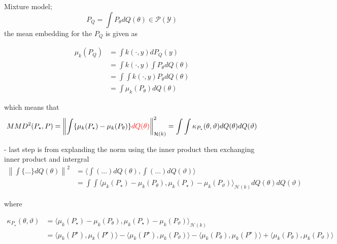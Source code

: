 \documentclass[mstat,12pt]{unswthesis}
\newcommand{\add}[1]{{\color{red}#1}}
\begin{document}
Mixture model; $$P_Q = \int P_\theta dQ(\theta) \in \mathcal{P}(\mathcal{Y})$$
the mean embedding for the $P_Q$ is given as

$$
    \begin{aligned}
        \mu_k(P_Q) & = \int k(\cdot, y) d P_Q(y) \\ &= \int k(\cdot, y)\int P_\theta dQ(\theta) \\ &= \int \int k(\cdot, y) P_\theta dQ(\theta) \\ &= \int \mu_k (P_{\theta}) dQ(\theta)
    \end{aligned}
$$

which means that
$$MMD^2(P_\star, P) = \left\| \int \{ \mu_k(P_\star) - \mu_k(P_\theta) \} \add{dQ(\theta)}\right\|^2_{\mathcal{H}(k)} = \int\int\kappa_{P_{\star}}(\theta, \vartheta) dQ(\theta)dQ(\vartheta)$$

- last step is from explanding the norm using the inner product then exchanging inner product and intergral
$$\begin{aligned}
        \left\| \int \{ \dots \} dQ(\theta) \right\|^2 & = \langle \int (\dots) dQ(\theta), \int (\dots) dQ(\vartheta) \rangle                                                                         \\
                                                       & = \int \int \langle \mu_k(P_\star) - \mu_k(P_\theta), \mu_k(P_\star) - \mu_k(P_{\vartheta}) \rangle_{\mathcal{H}(k)} dQ(\theta) dQ(\vartheta)
    \end{aligned}
$$


where


$$
    \begin{aligned}
        \kappa_{P_{\star}}(\theta, \vartheta) & = \langle \mu_k(P_\star) - \mu_k(P_\theta), \mu_k(P_\star) - \mu_k(P_{\vartheta}) \rangle_{\mathcal{H}(k)}                                                                                                    \\
                                              & = \langle \mu_k(P^\star), \mu_k(P^\star) \rangle - \langle \mu_k(P^\star), \mu_k(P_\vartheta) \rangle - \langle \mu_k(P_\theta), \mu_k(P^\star) \rangle + \langle \mu_k(P_\theta), \mu_k(P_\vartheta) \rangle
    \end{aligned}
$$
\end{document}
